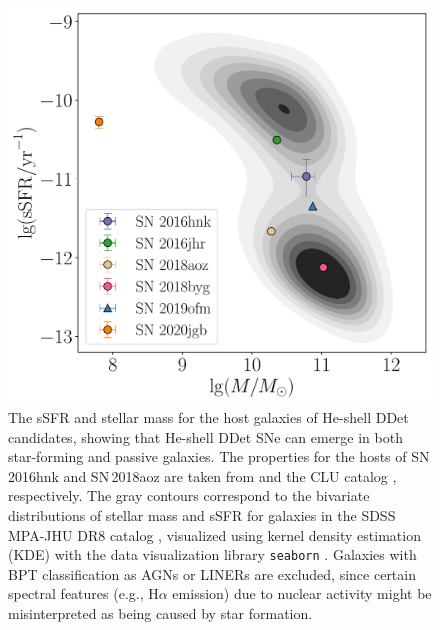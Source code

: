 \documentclass[twocolumn]{aastex631}
\begin{document}
\begin{figure}
    \centering
    \includegraphics[width=\linewidth]{host.pdf}
    \caption{The sSFR and stellar mass for the host galaxies of He-shell DDet candidates, showing that He-shell DDet SNe can emerge in both star-forming and passive galaxies. The properties for the hosts of SN\,2016hnk and SN\,2018aoz are taken from \citet{Dong_Ca-rich_2022} and the CLU catalog \citep{Cook_2019, de_Ca_rich_2020}, respectively. The gray contours correspond to the bivariate distributions of stellar mass and sSFR for galaxies in the SDSS MPA-JHU DR8 catalog \citep{Kauffmann_SDSS_2003,Brinchmann_SDSS_2004}, visualized using kernel density estimation (KDE) with the data visualization library \texttt{seaborn} \citep{Waskom_seaborn_2021}. Galaxies with BPT classification as AGNs or LINERs are excluded, since certain spectral features (e.g., H$\alpha$ emission) due to nuclear activity might be misinterpreted as being caused by star formation.}
    \label{fig:host}
\end{figure}
\end{document}
